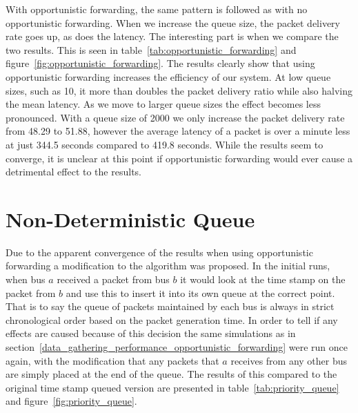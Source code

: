         With opportunistic forwarding, the same pattern is followed as with no opportunistic forwarding. When we increase the queue size, the packet delivery rate goes up, as does the latency. The interesting part is when we compare the two results. This is seen in table~\ref{tab:opportunistic_forwarding} and figure~\ref{fig:opportunistic_forwarding}. The results clearly show that using opportunistic forwarding increases the efficiency of our system. At low queue sizes, such as 10, it more than doubles the packet delivery ratio while also halving the mean latency. As we move to larger queue sizes the effect becomes less pronounced. With a queue size of 2000 we only increase the packet delivery rate from 48.29 to 51.88, however the average latency of a packet is over a minute less at just 344.5 seconds compared to 419.8 seconds. While the results seem to converge, it is unclear at this point if opportunistic forwarding would ever cause a detrimental effect to the results. 


    \section{Non-Deterministic Queue}\label{data_gathering_performance_non-deterministic_queue}

        Due to the apparent convergence of the results when using opportunistic forwarding a modification to the algorithm was proposed. In the initial runs, when bus $a$ received a packet from bus $b$ it would look at the time stamp on the packet from $b$ and use this to insert it into its own queue at the correct point. That is to say the queue of packets maintained by each bus is always in strict chronological order based on the packet generation time. In order to tell if any effects are caused because of this decision the same simulations as in section~\ref{data_gathering_performance_opportunistic_forwarding} were run once again, with the modification that any packets that $a$ receives from any other bus are simply placed at the end of the queue. The results of this compared to the original time stamp queued version are presented in table~\ref{tab:priority_queue} and figure~\ref{fig:priority_queue}.

